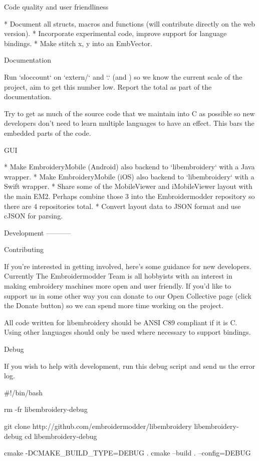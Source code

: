 \documentclass[a4paper]{report}
\begin{document}
{{{{{Code quality and user friendliness
~~~~~~~~~~~~~~~~~~~~~~~~~~~~~~~~~~

* Document all structs, macros and functions (will contribute directly
  on the web version).
* Incorporate experimental code, improve support for language bindings.
* Make stitch x, y into an EmbVector.

Documentation
~~~~~~~~~~~~~

Run `sloccount` on `extern/` and `.` (and ) so we know the
current scale of the project, aim to get this number low. Report the total as
part of the documentation.

Try to get as much of the source code that we maintain into C as possible so
new developers don't need to learn multiple languages to have an effect. This
bars the embedded parts of the code.

GUI
~~~

* Make EmbroideryMobile (Android) also backend to `libembroidery` with a Java wrapper.
* Make EmbroideryMobile (iOS) also backend to `libembroidery` with a Swift wrapper.
* Share some of the MobileViewer and iMobileViewer layout with the main EM2. Perhaps combine those 3 into the Embroidermodder repository so there are 4 repositories total.
* Convert layout data to JSON format and use cJSON for parsing.

Development
-----------

Contributing
~~~~~~~~~~~~

If you're interested in getting involved, here's some guidance
for new developers. Currently The Embroidermodder Team is all
hobbyists with an interest in making embroidery machines more
open and user friendly. If you'd like to support us in some other way
you can donate to our Open Collective page (click the Donate button) so
we can spend more time working on the project.

All code written for libembroidery should be ANSI C89 compliant
if it is C. Using other languages should only be used where
necessary to support bindings.

Debug
~~~~~

If you wish to help with development, run this debug script and send us the
error log.

    #!/bin/bash

    rm -fr libembroidery-debug

    git clone http://github.com/embroidermodder/libembroidery libembroidery-debug
    cd libembroidery-debug

    cmake -DCMAKE_BUILD_TYPE=DEBUG .
    cmake --build . --config=DEBUG

}}}}}
\end{document}
